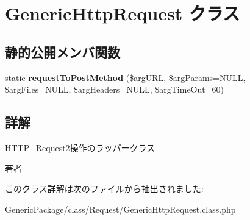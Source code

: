 \hypertarget{class_generic_http_request}{}\section{Generic\+Http\+Request クラス}
\label{class_generic_http_request}
\subsection*{静的公開メンバ関数}
\begin{DoxyCompactItemize}
\item 
\hypertarget{class_generic_http_request_afdf687ea834f02b56ed936945b68a991}{}static {\bfseries request\+To\+Post\+Method} (\$arg\+U\+R\+L, \$arg\+Params=N\+U\+L\+L, \$arg\+Files=N\+U\+L\+L, \$arg\+Headers=N\+U\+L\+L, \$arg\+Time\+Out=60)\label{class_generic_http_request_afdf687ea834f02b56ed936945b68a991}

\end{DoxyCompactItemize}


\subsection{詳解}
H\+T\+T\+P\+\_\+\+Request2操作のラッパークラス \begin{DoxyAuthor}{著者}

\end{DoxyAuthor}


このクラス詳解は次のファイルから抽出されました\+:\begin{DoxyCompactItemize}
\item 
Generic\+Package/class/\+Request/Generic\+Http\+Request.\+class.\+php\end{DoxyCompactItemize}
